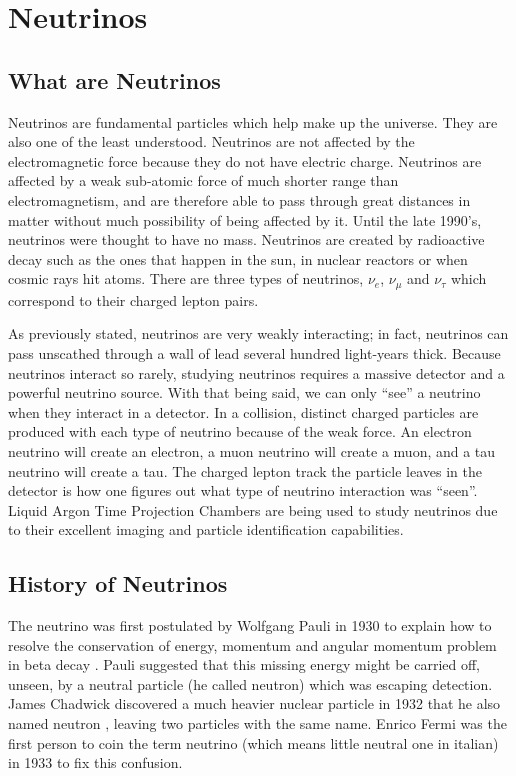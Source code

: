 \chapter{Neutrinos}\label{ch:neutrinos}

\section{What are Neutrinos}
Neutrinos are fundamental particles which help make up the universe. They are also one of the least understood. Neutrinos are not affected by the electromagnetic force because they do not have electric charge. Neutrinos are affected by a weak sub-atomic force of much shorter range than electromagnetism, and are therefore able to pass through great distances in matter without much possibility of being affected by it. Until the late 1990's, neutrinos were thought to have no mass. Neutrinos are created by radioactive decay such as the ones that happen in the sun, in nuclear reactors or when cosmic rays hit atoms. There are three types of neutrinos, $\nu_{e}$, $\nu_{\mu}$ and $\nu_{\tau}$ which correspond to their charged lepton pairs.  

As previously stated, neutrinos are very weakly interacting; in fact, neutrinos can pass unscathed through a wall of lead several hundred light-years thick. Because neutrinos interact so rarely, studying neutrinos requires a massive detector and a powerful neutrino source. With that being said, we can only ``see'' a neutrino when they interact in a detector. In a collision, distinct charged particles are produced with each type of neutrino because of the weak force. An electron neutrino will create an electron, a muon neutrino will create a muon, and a tau neutrino will create a tau. The charged lepton track the particle leaves in the detector is how one figures out what type of neutrino interaction was ``seen''. Liquid Argon Time Projection Chambers are being used to study neutrinos due to their excellent imaging and particle identification capabilities. 

\section{History of Neutrinos}
The neutrino was first postulated by Wolfgang Pauli in 1930 to explain how to resolve the conservation of energy, momentum and angular momentum problem in beta decay \cite{pauli}. Pauli suggested that this missing energy might be carried off, unseen, by a neutral particle (he called neutron) which was escaping detection. James Chadwick discovered a much heavier nuclear particle in 1932 that he also named neutron \cite{chadwick}, leaving two particles with the same name. Enrico Fermi was the first person to coin the term neutrino (which means little neutral one in italian) in 1933 to fix this confusion. 

